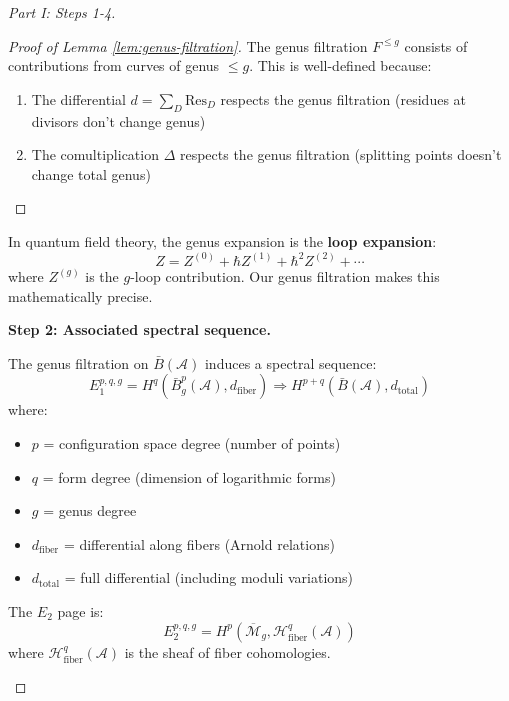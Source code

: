 \begin{proof}[Part I: Steps 1-4]
\begin{proof}[Proof of Lemma \ref{lem:genus-filtration}]
The genus filtration $F^{\leq g}$ consists of contributions from curves of genus 
$\leq g$. This is well-defined because:
\begin{enumerate}
\item The differential $d = \sum_{D} \text{Res}_D$ respects the genus filtration 
(residues at divisors don't change genus)
\item The comultiplication $\Delta$ respects the genus filtration (splitting points 
doesn't change total genus)
\end{enumerate}
\end{proof}

\begin{remark}
In quantum field theory, the genus expansion is the \textbf{loop expansion}:
\begin{equation}
Z = Z^{(0)} + \hbar Z^{(1)} + \hbar^2 Z^{(2)} + \cdots
\end{equation}
where $Z^{(g)}$ is the $g$-loop contribution. Our genus filtration makes this 
mathematically precise.
\end{remark}

\textbf{Step 2: Associated spectral sequence.}

\begin{theorem}
\label{thm:ss-quantum}
The genus filtration on $\bar{B}(\mathcal{A})$ induces a spectral sequence:
\begin{equation}
E_1^{p,q,g} = H^q\left(\bar{B}^p_g(\mathcal{A}), d_{\text{fiber}}\right) 
\Longrightarrow H^{p+q}\left(\bar{B}(\mathcal{A}), d_{\text{total}}\right)
\end{equation}
where:
\begin{itemize}
\item $p$ = configuration space degree (number of points)
\item $q$ = form degree (dimension of logarithmic forms)
\item $g$ = genus degree
\item $d_{\text{fiber}}$ = differential along fibers (Arnold relations)
\item $d_{\text{total}}$ = full differential (including moduli variations)
\end{itemize}

The $E_2$ page is:
\begin{equation}
E_2^{p,q,g} = H^p\left(\overline{\mathcal{M}}_g, \mathcal{H}^q_{\text{fiber}}(
\mathcal{A})\right)
\end{equation}
where $\mathcal{H}^q_{\text{fiber}}(\mathcal{A})$ is the sheaf of fiber cohomologies.
\end{theorem}


\end{proof}
